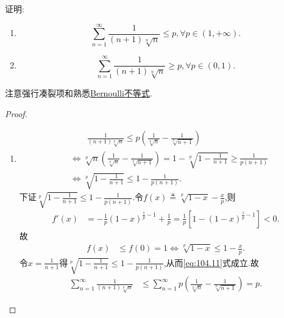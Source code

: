 \documentclass[../../main.tex]{subfiles}%
\begin{document}
\begin{example}
证明:
\begin{enumerate}
\item $$\sum_{n=1}^\infty \frac{1}{(n+1)\sqrt[n]{n}} \leqslant p,\forall p \in (1,+\infty).$$

\item $$\sum_{n=1}^\infty \frac{1}{(n+1)\sqrt[n]{n}} \geqslant p,\forall p \in (0,1).$$
\end{enumerate}
\end{example}
\begin{note}
注意强行凑裂项和熟悉\hyperref[theorem:Bernoulli不等式]{Bernoulli不等式}.
\end{note}
\begin{proof}
\begin{enumerate}
\item \begin{align}
&\quad \quad \frac{1}{\left( n+1 \right) \sqrt[p]{n}}\leqslant p\left( \frac{1}{\sqrt[p]{n}}-\frac{1}{\sqrt[p]{n+1}} \right) \label{eq:104.11} \\
&\Longleftrightarrow \sqrt[p]{n}\left( \frac{1}{\sqrt[p]{n}}-\frac{1}{\sqrt[p]{n+1}} \right) =1-\sqrt[p]{1-\frac{1}{n+1}}\geqslant \frac{1}{p\left( n+1 \right)} \nonumber \\
&\Longleftrightarrow \sqrt[p]{1-\frac{1}{n+1}}\leqslant 1-\frac{1}{p\left( n+1 \right)}.\nonumber
\end{align}
下证$\sqrt[p]{1-\frac{1}{n+1}}\leqslant 1-\frac{1}{p\left( n+1 \right)}$.令$f\left( x \right) \triangleq \sqrt[p]{1-x}-\frac{x}{p}$,则
\begin{align*}
f\prime \left( x \right) &=-\frac{1}{p}\left( 1-x \right) ^{\frac{1}{p}-1}+\frac{1}{p}=\frac{1}{p}\left[ 1-\left( 1-x \right) ^{\frac{1}{p}-1} \right] <0.
\end{align*}
故
\begin{align*}
f\left( x \right) &\leqslant f\left( 0 \right) =1\Longleftrightarrow \sqrt[p]{1-x}\leqslant 1-\frac{x}{p}.
\end{align*}
令$x=\frac{1}{n+1}$得$\sqrt[p]{1-\frac{1}{n+1}}\leqslant 1-\frac{1}{p\left( n+1 \right)}$,从而\eqref{eq:104.11}式成立.故
\begin{align*}
\sum_{n=1}^{\infty}{\frac{1}{\left( n+1 \right) \sqrt[p]{n}}}&\leqslant \sum_{n=1}^{\infty}{p\left( \frac{1}{\sqrt[p]{n}}-\frac{1}{\sqrt[p]{n+1}} \right)}=p.
\end{align*}


\end{enumerate}
\end{proof}
\end{document}
